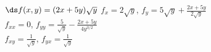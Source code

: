 {$\ds f(x,y) =(2x+5y)\sqrt{y}$
}
{$f_x=2\sqrt{y}$, $f_y=5\sqrt{y}+\frac{2x+5y}{2\sqrt{y}}$\\
$f_{xx}=0$, $f_{yy}=\frac{5}{\sqrt{y}}-\frac{2x+5y}{4y^{3/2}}$\\
$f_{xy}=\frac{1}{\sqrt{y}}$, $f_{yx}=\frac{1}{\sqrt{y}}$\\
}